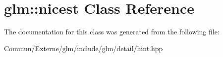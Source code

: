 \hypertarget{classglm_1_1nicest}{}\section{glm\+:\+:nicest Class Reference}
\label{classglm_1_1nicest}


The documentation for this class was generated from the following file\+:\begin{DoxyCompactItemize}
\item 
Commun/\+Externe/glm/include/glm/detail/hint.\+hpp\end{DoxyCompactItemize}
